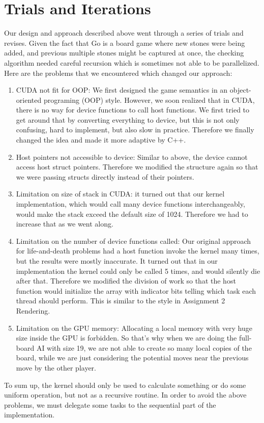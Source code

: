 \documentclass[11pt]{article}
\begin{document}
\section*{Trials and Iterations}
Our design and approach described above went through a series of trials and revises. Given the fact that Go is a board game where new stones were being added, and previous multiple stones might be captured at once, the checking algorithm needed careful recursion which is sometimes not able to be parallelized. Here are the problems that we encountered which changed our approach:
\begin{enumerate}
\item CUDA not fit for OOP: We first designed the game semantics in an object-oriented programing (OOP) style. However, we soon realized that in CUDA, there is no way for device functions to call host functions. We first tried to get around that by converting everything to device, but this is not only confusing, hard to implement, but also slow in practice. Therefore we finally changed the idea and made it more adaptive by C++.
\item Host pointers not accessible to device: Similar to above, the device cannot access host struct pointers. Therefore we modified the structure again so that we were passing structs directly instead of their pointers. 
\item Limitation on size of stack in CUDA: it turned out that our kernel implementation, which would call many device functions interchangeably, would  make the stack exceed the default size of 1024. Therefore we had to increase that as we went along. 
\item Limitation on the number of device functions called: Our original approach for life-and-death problems had a host function invoke the kernel many times, but the results were mostly inaccurate. It turned out that in our implementation the kernel could only be called 5 times, and would silently die after that. Therefore we modified the division of work so that the host function would initialize the array with indicator bits telling which task each thread should perform. This is similar to the style in Assignment 2 Rendering.
\item Limitation on the GPU memory: Allocating a local memory with very huge size inside the GPU is forbidden. So that's why when we are doing the full-board AI with size 19, we are not able to create so many local copies of the board, while we are just considering the potential moves near the previous move by the other player. 
\end{enumerate}
To sum up, the kernel should only be used to calculate something or do some uniform operation, but not as a recursive routine. In order to avoid the above problems, we must delegate some tasks to the sequential part of the implementation.\\
\end{document}
